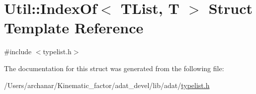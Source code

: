 \hypertarget{structUtil_1_1TL_1_1IndexOf}{}\section{Util\+:\+:Index\+Of$<$ T\+List, T $>$ Struct Template Reference}
\label{structUtil_1_1TL_1_1IndexOf}


{\ttfamily \#include $<$typelist.\+h$>$}



The documentation for this struct was generated from the following file\+:\begin{DoxyCompactItemize}
\item 
/\+Users/archanar/\+Kinematic\+\_\+factor/adat\+\_\+devel/lib/adat/\mbox{\hyperlink{lib_2adat_2typelist_8h}{typelist.\+h}}\end{DoxyCompactItemize}
